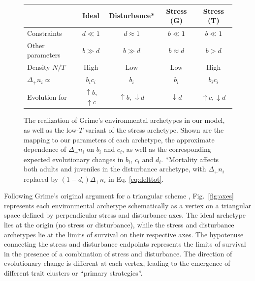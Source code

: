 \documentclass[11pt]{article}
\begin{document}
\begin{figure}
\centering
\begin{tabular}{l*{4}{c}}
  & Ideal & Disturbance* & Stress (G) & Stress (T) \\ \hline
  Constraints & $d \ll 1$ & $d \approx 1$ & $b \ll 1$ & $b \ll 1$ \\
  Other parameters & $b\gg d$ & $b\gg d$ & $b\approx d$ & $b>d$ \\
  Density $N/T$  & High & Low & Low & High \\
  $\Delta_+ n_i\propto$ & $b_i c_i$ & $b_i$ & $b_i$ & $b_i c_i$ \\
  Evolution for & $\uparrow b$, $ \uparrow c$ & $\uparrow b$, $\downarrow d$ & $\downarrow d$ & $\uparrow c, \downarrow d$
\end{tabular}
\caption{\label{fig:table} The realization of Grime's environmental archetypes in our model, as well as the low-$T$ variant of the stress archetype. Shown are the mapping to our parameters of each archetype, the approximate dependence of $\Delta_+ n_i$ on $b_i$ and $c_i$, as well as the corresponding expected evolutionary changes in $b_i$, $c_i$ and $d_i$. *Mortality affects both adults and juveniles in the disturbance archetype, with $\Delta_+ n_i$ replaced by $(1-d_i)\Delta_+ n_i$ in Eq. \eqref{eq:delttot}.}
\end{figure}

Following Grime's original argument for a triangular scheme \citep{grime_1977}, Fig.~\ref{fig:axes} represents each environmental archetype schematically as a vertex on a triangular space defined by perpendicular stress and disturbance axes. The ideal archetype lies at the origin (no stress or disturbance), while the stress and disturbance archetypes lie at the limits of survival on their respective axes. The hypotenuse connecting the stress and disturbance endpoints represents the limits of survival in the presence of a combination of stress and disturbance. The direction of evolutionary change is different at each vertex, leading to the emergence of different trait clusters or ``primary strategies''. 
\end{document}
